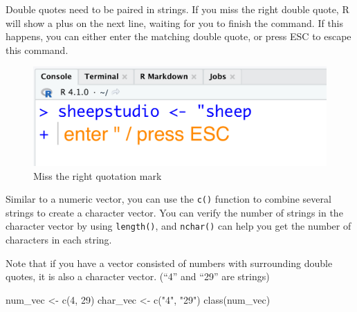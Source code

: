 \documentclass[
]{book}
\newenvironment{Shaded}{\begin{snugshade}}{\end{snugshade}}
\newcommand{\DecValTok}[1]{\textcolor[rgb]{0.00,0.00,0.81}{#1}}
\newcommand{\FunctionTok}[1]{\textcolor[rgb]{0.00,0.00,0.00}{#1}}
\newcommand{\NormalTok}[1]{#1}
\newcommand{\OtherTok}[1]{\textcolor[rgb]{0.56,0.35,0.01}{#1}}
\newcommand{\StringTok}[1]{\textcolor[rgb]{0.31,0.60,0.02}{#1}}
\newenvironment{infobox}[1]
  {
  \begin{itemize}
  \renewcommand{\labelitemi}{
    \raisebox{-.7\height}[0pt][0pt]{
      {\setkeys{Gin}{width=3em,keepaspectratio}
        \texttt{[image: pics/\#1]}}
    }
  }
  \setlength{\fboxsep}{1em}
  \begin{blackbox}
  \item
  }
  {
  \end{blackbox}
  \end{itemize}
  }
\newenvironment{blackbox}{
  \definecolor{shadecolor}{rgb}{0, 0, 0}  %
  \color{white}
  \begin{shaded}}
 {\end{shaded}}
\begin{document}
\begin{infobox}{caution}

Double quotes need to be paired in strings. If you miss the right double quote, R will show a plus on the next line, waiting for you to finish the command. If this happens, you can either enter the matching double quote, or press ESC to escape this command.

\begin{figure}

{\centering \includegraphics[width=0.7\linewidth]{pics/2quo} 

}

\caption{Miss the right quotation mark}\label{fig:quo}
\end{figure}

\end{infobox}

Similar to a numeric vector, you can use the \texttt{c()} function to combine several strings to create a character vector. You can verify the number of strings in the character vector by using \texttt{length()}, and \texttt{nchar()} can help you get the number of characters in each string.

\begin{Shaded}
\end{Shaded}

Note that if you have a vector consisted of numbers with surrounding double quotes, it is also a character vector. (``4'' and ``29'' are strings)

\begin{Shaded}
\begin{Highlighting}[]
\NormalTok{num\_vec }\OtherTok{\textless{}{-}} \FunctionTok{c}\NormalTok{(}\DecValTok{4}\NormalTok{, }\DecValTok{29}\NormalTok{)}
\NormalTok{char\_vec }\OtherTok{\textless{}{-}} \FunctionTok{c}\NormalTok{(}\StringTok{"4"}\NormalTok{, }\StringTok{"29"}\NormalTok{) }
\FunctionTok{class}\NormalTok{(num\_vec)}
\end{Highlighting}
\end{Shaded}
\end{document}
